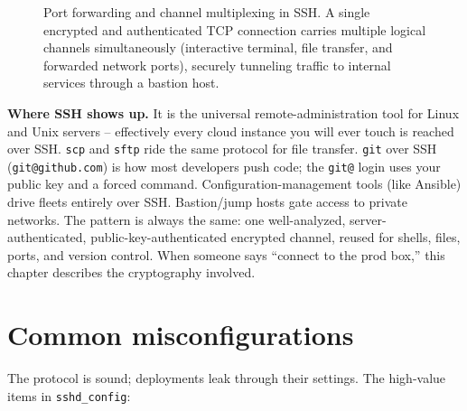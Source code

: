 \begin{figure}[H]
\caption{Port forwarding and channel multiplexing in SSH. A single encrypted and authenticated
TCP connection carries multiple logical channels simultaneously (interactive terminal, file transfer,
and forwarded network ports), securely tunneling traffic to internal services through a bastion host.}
\label{ch28:fig-port-forwarding}
\end{figure}

\begin{applicationbox}
\textbf{Where SSH shows up.} It is the universal remote-administration tool for Linux and Unix servers -- effectively every cloud instance you will ever touch is reached over SSH. \texttt{scp} and \texttt{sftp} ride the same protocol for file transfer. \texttt{git} over SSH (\texttt{git@github.com}) is how most developers push code; the \texttt{git@} login uses your public key and a forced command. Configuration-management tools (like Ansible) drive fleets entirely over SSH. Bastion/jump hosts gate access to private networks. The pattern is always the same: one well-analyzed, server-authenticated, public-key-authenticated encrypted channel, reused for shells, files, ports, and version control. When someone says ``connect to the prod box,'' this chapter describes the cryptography involved.
\end{applicationbox}

\section{Common misconfigurations}

The protocol is sound; deployments leak through their settings. The high-value items in \texttt{sshd\_config}:

